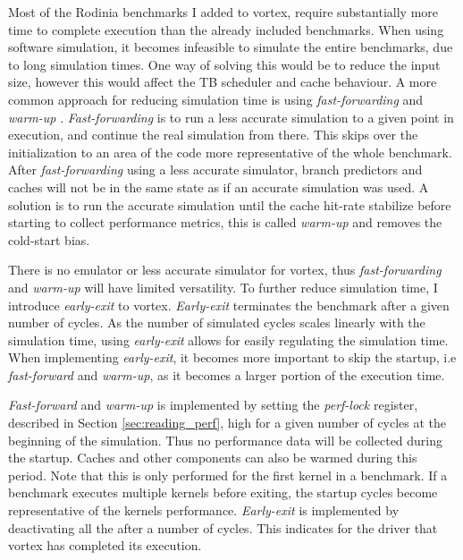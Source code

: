Most of the Rodinia benchmarks I added to \Gls{vortex}, require substantially more time to complete execution than the already included benchmarks. When using software simulation, it becomes infeasible to simulate the entire benchmarks, due to long simulation times. One way of solving this would be to reduce the input size, however this would affect the TB scheduler and cache behaviour. A more common approach for reducing simulation time is using \textit{fast-forwarding} and \textit{warm-up} \cite{simpoint}. \textit{Fast-forwarding} is to run a less accurate simulation to a given point in execution, and continue the real simulation from there. This skips over the initialization to an area of the code more representative of the whole benchmark. After \textit{fast-forwarding} using a less accurate simulator, branch predictors and caches will not be in the same state as if an accurate simulation was used. A solution is to run the accurate simulation until the cache hit-rate stabilize before starting to collect performance metrics, this is called \textit{warm-up} and removes the cold-start bias.

There is no emulator or less accurate simulator for \Gls{vortex}, thus \textit{fast-forwarding} and \textit{warm-up} will have limited versatility. To further reduce simulation time, I introduce \textit{early-exit} to \Gls{vortex}. \textit{Early-exit} terminates the benchmark after a given number of cycles. As the number of simulated cycles scales linearly with the simulation time, using \textit{early-exit} allows for easily regulating the simulation time. When implementing \textit{early-exit}, it becomes more important to skip the startup, i.e \textit{fast-forward} and \textit{warm-up}, as it becomes a larger portion of the execution time. 

\textit{Fast-forward} and \textit{warm-up} is implemented by setting the \textit{perf-lock} register, described in Section \ref{sec:reading_perf}, high for a given number of cycles at the beginning of the simulation. Thus no performance data will be collected during the startup. Caches and other components can also be warmed during this period. Note that this is only performed for the first kernel in a benchmark. If a benchmark executes multiple kernels before exiting, the startup cycles become representative of the kernels performance. \textit{Early-exit} is implemented by deactivating all the  after a number of cycles. This indicates for the driver that \Gls{vortex} has completed its execution. 

